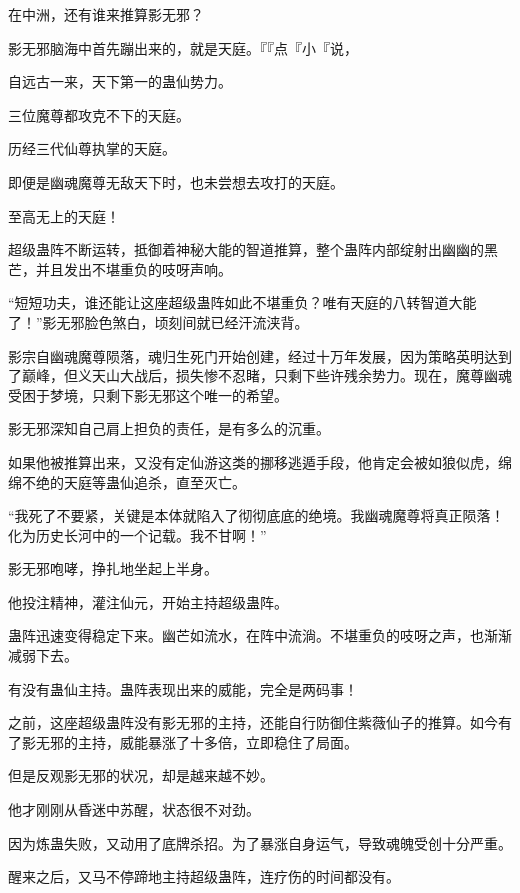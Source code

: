 
\begin{this_body}



在中洲，还有谁来推算影无邪？

影无邪脑海中首先蹦出来的，就是天庭。『『点『小『说，

自远古一来，天下第一的蛊仙势力。

三位魔尊都攻克不下的天庭。

历经三代仙尊执掌的天庭。

即便是幽魂魔尊无敌天下时，也未尝想去攻打的天庭。

至高无上的天庭！

超级蛊阵不断运转，抵御着神秘大能的智道推算，整个蛊阵内部绽射出幽幽的黑芒，并且发出不堪重负的吱呀声响。

“短短功夫，谁还能让这座超级蛊阵如此不堪重负？唯有天庭的八转智道大能了！”影无邪脸色煞白，顷刻间就已经汗流浃背。

影宗自幽魂魔尊陨落，魂归生死门开始创建，经过十万年发展，因为策略英明达到了巅峰，但义天山大战后，损失惨不忍睹，只剩下些许残余势力。现在，魔尊幽魂受困于梦境，只剩下影无邪这个唯一的希望。

影无邪深知自己肩上担负的责任，是有多么的沉重。

如果他被推算出来，又没有定仙游这类的挪移逃遁手段，他肯定会被如狼似虎，绵绵不绝的天庭等蛊仙追杀，直至灭亡。

“我死了不要紧，关键是本体就陷入了彻彻底底的绝境。我幽魂魔尊将真正陨落！化为历史长河中的一个记载。我不甘啊！”

影无邪咆哮，挣扎地坐起上半身。

他投注精神，灌注仙元，开始主持超级蛊阵。

蛊阵迅速变得稳定下来。幽芒如流水，在阵中流淌。不堪重负的吱呀之声，也渐渐减弱下去。

有没有蛊仙主持。蛊阵表现出来的威能，完全是两码事！

之前，这座超级蛊阵没有影无邪的主持，还能自行防御住紫薇仙子的推算。如今有了影无邪的主持，威能暴涨了十多倍，立即稳住了局面。

但是反观影无邪的状况，却是越来越不妙。

他才刚刚从昏迷中苏醒，状态很不对劲。

因为炼蛊失败，又动用了底牌杀招。为了暴涨自身运气，导致魂魄受创十分严重。

醒来之后，又马不停蹄地主持超级蛊阵，连疗伤的时间都没有。


\end{this_body}
